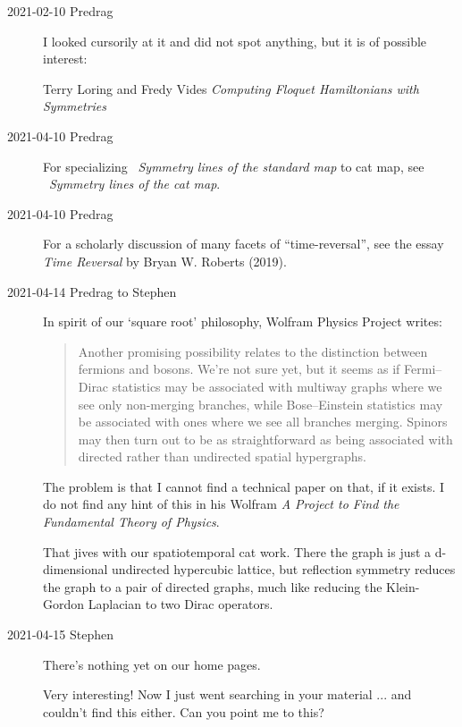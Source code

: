 \begin{description}
    \item[2021-02-10 Predrag] I looked cursorily at it
and did not spot anything, but it is of possible interest:

Terry Loring and Fredy Vides
{\em Computing Floquet Hamiltonians with Symmetries}

    \item[2021-04-10 Predrag]
For specializing  ~{\em Symmetry lines of the standard map}
to cat map, see ~{\em Symmetry lines of the cat map}.

    \item[2021-04-10 Predrag]
For a scholarly discussion of many facets of ``time-reversal'', see the
essay 
{{\em Time Reversal}} by Bryan W. Roberts (2019).

    \item[2021-04-14 Predrag to Stephen]
In spirit of our `square root' philosophy,
{Wolfram Physics Project} writes:
 \begin{quote}
Another promising possibility relates to the distinction between fermions
and bosons. We’re not sure yet, but it seems as if Fermi–Dirac statistics
may be associated with multiway graphs where we see only non-merging
branches, while Bose–Einstein statistics may be associated with ones
where we see all branches merging. Spinors may then turn out to be as
straightforward as being associated with directed rather than undirected
spatial hypergraphs.
 \end{quote}
The problem is that I cannot find a technical paper on that,
if it exists. I do not find any hint of this in his
Wolfram
{\em A Project to Find the Fundamental Theory of Physics}.

That jives with our spatiotemporal cat work. There the graph is just a
d-dimensional undirected hypercubic lattice,  but reflection symmetry
reduces the graph to a pair of directed graphs, much like reducing the
Klein-Gordon Laplacian to two Dirac operators.

    \item[2021-04-15 Stephen]
There's nothing yet on our home pages.

Very interesting!   Now I just went searching in your material ... and
couldn't find this either.  Can you point me to this?


\end{description}
